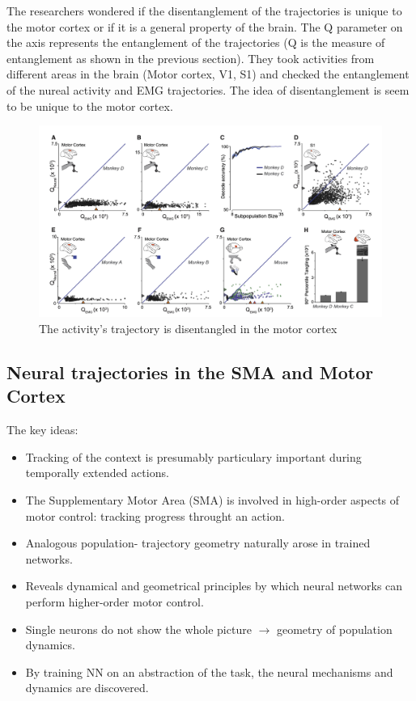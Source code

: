 \documentclass[11pt]{book} %
\begin{document}
The researchers wondered if the disentanglement of the trajectories is unique to the motor cortex or if it is a general property of the brain.
The Q parameter on the axis represents the entanglement of the trajectories (Q is the measure of entanglement as shown in the previous section).
They took activities from different areas in the brain (Motor cortex, V1, S1) and checked the entanglement of the nureal activity and EMG trajectories.
The idea of disentanglement is seem to be unique to the motor cortex.

\begin{figure}[h]
    \centering
    \includegraphics[width=\textwidth]{./Figs/monkey6.jpeg}
    \caption{The activity's trajectory is disentangled in the motor cortex}
    \label{fig:entanglement_untangling}
\end{figure}



\subsection{Neural trajectories in the SMA and Motor Cortex}

The key ideas: 
\begin{itemize}
    \item Tracking of the context is presumably particulary important during temporally extended actions.
    \item The Supplementary Motor Area (SMA) is involved in high-order aspects of motor control: tracking progress throught an action.
    \item Analogous population- trajectory geometry naturally arose in trained networks.
    \item Reveals dynamical and geometrical principles by which neural networks can perform higher-order motor control.
    \item Single neurons do not show the whole picture $\rightarrow$ geometry of population dynamics.
    \item By training NN on an abstraction of the task, the neural mechanisms and dynamics are discovered.
\end{itemize}
\end{document}
